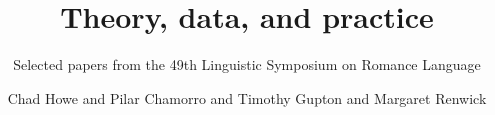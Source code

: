\title{Theory, data, and practice}
\subtitle{Selected papers from the 49th Linguistic Symposium on Romance Language}
\author{Chad Howe and Pilar Chamorro and Timothy Gupton and Margaret Renwick}
\renewcommand{\lsSeries}{orl}
\renewcommand{\lsSeriesNumber}{1}
